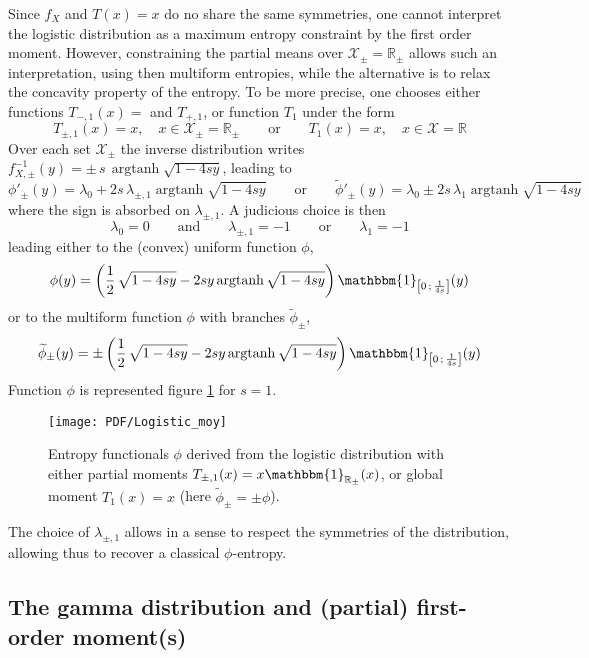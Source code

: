 \documentclass[english,onecolumn]{elsarticle}
\def\Rset{\mathbb{R}}
\def\X{\mathcal{X}}
\def\un{\mathbbm{1}}
\def\argtanh{\operatorname{argtanh}}
\begin{document}
Since $f_X$ and $T(x) = x$ do no share the same symmetries, one cannot interpret
the logistic  distribution as  a maximum entropy  constraint by the  first order
moment.   However, constraining  the  partial means  over  $\X_\pm =  \Rset_\pm$
allows  such  an  interpretation,  using  then multiform  entropies,  while  the
alternative  is to  relax the  concavity  property of  the entropy.  To be  more
precise, one chooses either functions $T_{-,1}(x) = $ and $T_{+,1}$, or function
$T_1$ under the form
%
\[
T_{\pm,1}(x) = x, \quad x \in \X_\pm = \Rset_\pm \qquad \mbox{or} \qquad T_1(x)
= x, \quad x \in \X = \Rset
\]
%
Over each set $\X_\pm$ the  inverse distribution writes $f_{X,\pm}^{-1}(y) = \pm
\, s \, \argtanh \sqrt{1-4 s y}$, leading to
%
\[
\phi'_\pm(y) = \lambda_0 + 2 s \, \lambda_{\pm,1} \argtanh \sqrt{1-4 s y} \qquad
\mbox{or} \qquad \widetilde{\phi}'_\pm(y) = \lambda_0 \pm 2 s \, \lambda_1
\argtanh \sqrt{1-4 s y}
\]
%
where the sign is absorbed on $\lambda_{\pm,1}$. A judicious choice is then
%
\[
\lambda_0 = 0 \qquad \mbox{and} \qquad \lambda_{\pm,1} = -1 \qquad \mbox{or}
\qquad \lambda_1 = -1
\]
%
leading either to the (convex) uniform function $\phi$,
\[
\phi(y) = \left( \frac12 \, \sqrt{1 - 4 s y} - 2 s y \argtanh \sqrt{1 - 4 s y}
\right) \un_{\left[ 0 \, ; \, \frac{1}{4 s} \right]}(y)
\]
%
or to the multiform function $\phi$ with branches $\widetilde{\phi}_\pm$,
\[
\widetilde{\phi}_\pm(y) = \pm \left( \frac12 \, \sqrt{1 - 4 s y} - 2 s y \argtanh
\sqrt{1 - 4 s y} \right) \un_{\left[ 0 \, ; \, \frac{1}{4 s} \right]}(y)
\]
%
Function $\phi$ is represented figure \ref{fig:Entropy-logistic-moy}  for $s =
1$.
%
\begin{figure}[htbp]
\centerline{\texttt{[image: PDF/Logistic\_moy]}}
\caption{Entropy functionals $\phi$ derived  from the logistic distribution with
  either partial moments $T_{\pm,1}(x) = x \un_{\Rset_\pm}(x)$, or global moment
  $T_1(x) = x$ (here $\widetilde{\phi}_\pm = \pm \phi$).}
\label{fig:Entropy-logistic-moy}
\end{figure}

The choice  of $\lambda_{\pm,1}$ allows in  a sense to respect  the symmetries of
the distribution, allowing thus to recover a classical $\phi$-entropy.



\subsection{The gamma distribution and (partial) first-order moment(s)}
\label{subsec:GammaFirstOrder}
\end{document}
